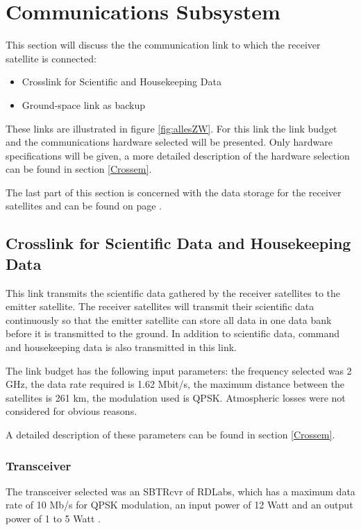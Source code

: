 \section{Communications Subsystem}
\label{sec:comm_receiver}
This section will discuss the  the communication link to which the receiver satellite is connected:
\begin{itemize}
\item Crosslink for Scientific and Housekeeping Data
\item Ground-space link as backup
\end{itemize}

These links are illustrated in figure \ref{fig:allesZW}.
For this link the link budget and the communications hardware selected will be presented. Only hardware specifications will be given, a more detailed description of the hardware selection can be found in section \ref{Crossem}.

The last part of this section is concerned with the data storage for the receiver satellites and can be found on page \pageref{DSReceiver}.

\subsection{Crosslink for Scientific Data and Housekeeping Data}
This link transmits the scientific data gathered by the receiver satellites to the emitter satellite. The receiver satellites will transmit their scientific data continuously so that the emitter satellite can store all data in one data bank before it is transmitted to the ground. In addition to scientific data, command and housekeeping data is also transmitted in this link.

The link budget has the following input parameters: the frequency selected was 2 GHz, the data rate required is 1.62 Mbit/s, the maximum distance between the satellites is 261 km, the modulation used is QPSK. Atmospheric losses were not considered for obvious reasons.

A detailed description of these parameters can be found in section \ref{Crossem}.

\subsubsection{Transceiver}
The transceiver selected was an SBTRcvr of RDLabs, which has a maximum data rate of 10 Mb/s for QPSK modulation, an input power of 12 Watt and an output power of 1 to 5 Watt \cite{RDLabs}.


